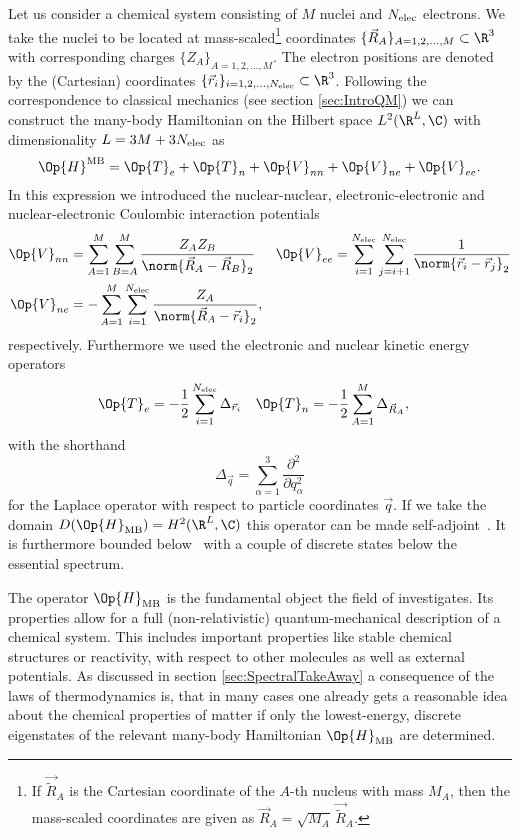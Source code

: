 Let us consider a chemical system consisting of $M$ nuclei and $N_\text{elec}$ electrons.
We take the nuclei to be located at mass-scaled\footnote{
	If $\vec{\tilde{R}}_A$ is the Cartesian coordinate
	of the $A$-th nucleus with mass $M_A$, then
	the mass-scaled coordinates are given as
	$\vec{R}_A = \sqrt{M_A} \, \vec{\tilde{R}}_A$.
} coordinates
$\{\vec{R}_A\}_{A = 1, 2, \ldots, M} \subset \R^3$
with corresponding charges
$\{Z_A\}_{A = 1, 2, \ldots, M}$.
The electron positions are denoted by the (Cartesian) coordinates
$\{\vec{r}_i\}_{i = 1, 2, \ldots, \Nelec} \subset \R^3$.
Following the correspondence to classical mechanics (see section \vref{sec:IntroQM})
we can construct the many-body Hamiltonian
on the Hilbert space $L^2(\R^L, \C)$ with dimensionality $L = 3M+3N_\text{elec}$ as
\begin{equation}
	\Op{H}^\text{MB} = \Op{T}_e + \Op{T}_n + \Op{V}_{nn} + \Op{V}_{ne} + \Op{V}_{ee}.
	\label{eqn:ManyBodyHamiltonian}
\end{equation}
In this expression we introduced the
nuclear-nuclear, electronic-electronic and nuclear-electronic
Coulombic interaction potentials
\begin{align}
	\label{eqn:ManyBodyHamiltonianPotential}
	\Op{V}_{nn} &= \sum_{A=1}^M \sum_{B=A}^M
		\frac{Z_A Z_B}{\norm{\vec{R}_A - \vec{R}_B}_2} &
	\Op{V}_{ee} &= \sum_{i=1}^{\Nelec} \sum_{j=i+1}^{\Nelec}
		\frac{1}{\norm{\vec{r}_i - \vec{r}_j}_2} \\
	\nonumber
	\Op{V}_{ne} &= - \sum_{A=1}^M \sum_{i=1}^{\Nelec} \frac{Z_A}{\norm{\vec{R}_A - \vec{r}_i}_2},
\end{align}
respectively.
Furthermore we used the electronic and nuclear kinetic energy operators
\begin{align}
	\label{eqn:ManyBodyHamiltonianKinetic}
	\Op{T}_e &= -\frac12 \sum_{i=1}^{\Nelec} \Delta_{\vec{r}_i} &
	\Op{T}_n &= -\frac12 \sum_{A=1}^M \Delta_{\vec{R}_A},
\end{align}
with the shorthand
\[ \Delta_{\vec{q}} = \sum_{\alpha=1}^3 \frac{\partial^2}{\partial q_\alpha^2} \]
for the Laplace operator with respect to particle coordinates $\vec{q}$.
If we take the domain $D(\Op{H}_\text{MB}) = H^2(\R^L, \C)$
this operator can be made self-adjoint~\cite{Kato1951}.
It is furthermore bounded below~\cite{Kato1951}
with a couple of discrete states below the essential spectrum.

The operator $\Op{H}_\text{MB}$ is the fundamental object
the field of  investigates.
Its properties allow for a full
(non-relativistic) quantum-mechanical description
of a chemical system.
This includes important properties like stable chemical structures
or reactivity, with respect to other molecules as well as external potentials.
As discussed in section \vref{sec:SpectralTakeAway}
a consequence of the laws of thermodynamics is,
that in many cases one already gets
a reasonable idea about the chemical properties of matter
if only the lowest-energy, discrete eigenstates of the relevant
many-body Hamiltonian $\Op{H}_\text{MB}$ are determined.


